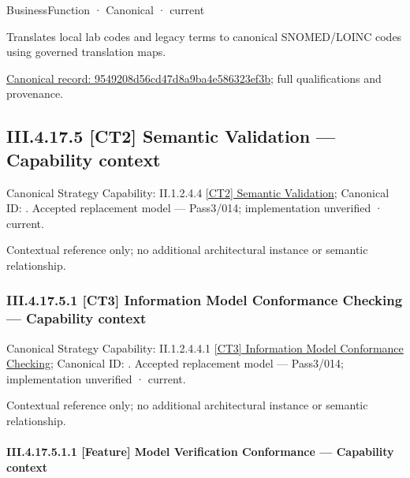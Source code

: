 \label{element:9549208d56cd47d8a9ba4e586323ef3b}
{\small BusinessFunction · Canonical · current}\par

Translates local lab codes and legacy terms to canonical SNOMED/LOINC codes using governed translation maps.


{\footnotesize \href{../../../../../../../../continuum/business/business-function/9549208d56cd47d8a9ba4e586323ef3b.md}{Canonical record: 9549208d56cd47d8a9ba4e586323ef3b}; full qualifications and provenance.}\par
\subsection*{III.4.17.5 [CT2] Semantic Validation — Capability context}
\label{navigation:III.4.17.5}

{\small Canonical Strategy Capability: II.1.2.4.4 \hyperref[element:5dfb80f15eff4ec8bbb60016d36a5cd1]{[CT2] Semantic Validation}; Canonical ID: \texttt{}. Accepted replacement model — Pass3/014; implementation unverified · current.}\par
Contextual reference only; no additional architectural instance or semantic relationship.\par
\subsubsection*{III.4.17.5.1 [CT3] Information Model Conformance Checking — Capability context}
\label{navigation:III.4.17.5.1}

{\small Canonical Strategy Capability: II.1.2.4.4.1 \hyperref[element:a3a6683b5a48418ca51c94784fc24bee]{[CT3] Information Model Conformance Checking}; Canonical ID: \texttt{}. Accepted replacement model — Pass3/014; implementation unverified · current.}\par
Contextual reference only; no additional architectural instance or semantic relationship.\par
\paragraph*{III.4.17.5.1.1 [Feature] Model Verification Conformance — Capability context}
\label{navigation:III.4.17.5.1.1}


